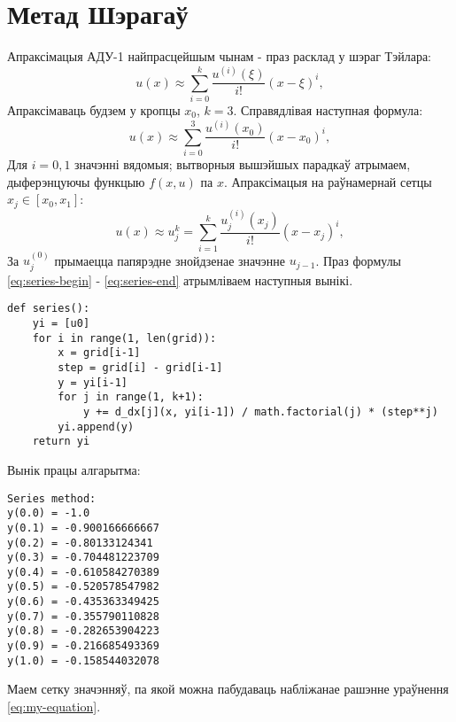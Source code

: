 \section{Метад Шэрагаў}

Апраксімацыя АДУ-1 найпрасцейшым чынам - праз расклад у шэраг Тэйлара:\\
\begin{equation} \label{eq:series-begin}
    u(x) \approx \sum_{i=0}^{k} \frac{u^{(i)}(\xi)}{i!}(x-\xi)^{i},
\end{equation}
Апраксімаваць будзем у кропцы $x_0$, $k = 3$. Справядлівая наступная формула:
\begin{equation}
    u(x) \approx \sum_{i=0}^{3} \frac{u^{(i)}(x_0)}{i!}(x-x_0)^{i},
\end{equation}
Для $i = 0, 1$ значэнні вядомыя; вытворныя вышэйшых парадкаў атрымаем, дыферэнцуючы функцыю $f(x, u)$ па $x$.
Апраксімацыя на раўнамернай сетцы $x_j \in [x_0, x_1]$:
\begin{equation} \label{eq:series-end}
    u(x) \approx u_j^k = \sum_{i=1}^{k} \frac{u_j^{(i)}(x_j)}{i!}(x-x_j)^{i},
\end{equation}
За $u_j^{(0)}$ прымаецца папярэдне знойдзенае значэнне $u_{j-1}$.
Праз формулы \eqref{eq:series-begin} - \eqref{eq:series-end} атрымліваем наступныя вынікі.

{\small
\begin{verbatim}
def series():
    yi = [u0]
    for i in range(1, len(grid)):
        x = grid[i-1]
        step = grid[i] - grid[i-1]
        y = yi[i-1]
        for j in range(1, k+1):
            y += d_dx[j](x, yi[i-1]) / math.factorial(j) * (step**j)
        yi.append(y)
    return yi
\end{verbatim}
}

Вынік працы алгарытма:

{\small
\begin{verbatim}
Series method:
y(0.0) = -1.0
y(0.1) = -0.900166666667
y(0.2) = -0.80133124341
y(0.3) = -0.704481223709
y(0.4) = -0.610584270389
y(0.5) = -0.520578547982
y(0.6) = -0.435363349425
y(0.7) = -0.355790110828
y(0.8) = -0.282653904223
y(0.9) = -0.216685493369
y(1.0) = -0.158544032078
\end{verbatim}
}

Маем сетку значэнняў, па якой можна пабудаваць набліжанае рашэнне ураўнення \eqref{eq:my-equation}.
